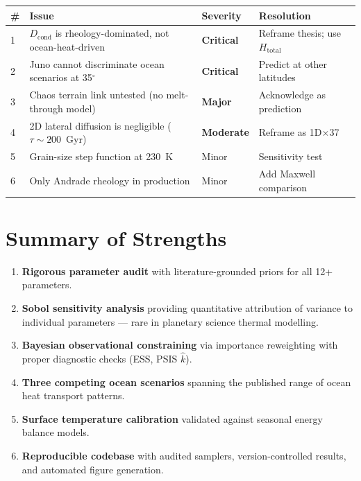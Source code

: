 \documentclass[11pt,a4paper]{article}
\begin{document}
\begin{center}
\begin{tabular}{p{0.5cm}p{5.5cm}p{3cm}p{4cm}}
\toprule
\textbf{\#} & \textbf{Issue} & \textbf{Severity} & \textbf{Resolution} \\
\midrule
1 & $D_\mathrm{cond}$ is rheology-dominated, not ocean-heat-driven
  & \textcolor{critred}{\textbf{Critical}} & Reframe thesis; use $H_\mathrm{total}$ \\
2 & Juno cannot discriminate ocean scenarios at 35$^\circ$
  & \textcolor{critred}{\textbf{Critical}} & Predict at other latitudes \\
3 & Chaos terrain link untested (no melt-through model)
  & \textcolor{warnorg}{\textbf{Major}} & Acknowledge as prediction \\
4 & 2D lateral diffusion is negligible ($\tau \sim 200$~Gyr)
  & \textcolor{warnorg}{\textbf{Moderate}} & Reframe as 1D$\times$37 \\
5 & Grain-size step function at 230~K
  & \textcolor{okblue}{Minor} & Sensitivity test \\
6 & Only Andrade rheology in production
  & \textcolor{okblue}{Minor} & Add Maxwell comparison \\
\bottomrule
\end{tabular}
\end{center}

\section{Summary of Strengths}

\begin{enumerate}[leftmargin=2em]
\item \textbf{Rigorous parameter audit} with literature-grounded priors
      for all 12+ parameters.
\item \textbf{Sobol sensitivity analysis} providing quantitative attribution
      of variance to individual parameters --- rare in planetary science
      thermal modelling.
\item \textbf{Bayesian observational constraining} via importance reweighting
      with proper diagnostic checks (ESS, PSIS $\hat{k}$).
\item \textbf{Three competing ocean scenarios} spanning the published
      range of ocean heat transport patterns.
\item \textbf{Surface temperature calibration} validated against seasonal
      energy balance models.
\item \textbf{Reproducible codebase} with audited samplers, version-controlled
      results, and automated figure generation.
\end{enumerate}
\end{document}
